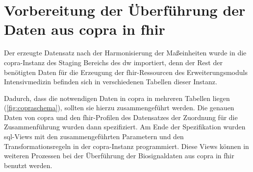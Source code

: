 \section[Vorbereitung der Überführung der Daten aus \acs{copra} in \acs{fhir}]{ Vorbereitung der Überführung der Daten aus \acs{copra} in \acs{fhir}} \label{sec:docutransfer}

Der erzeugte Datensatz nach der Harmonisierung der Maßeinheiten wurde in die \ac{copra}-Instanz des Staging Bereichs des \ac{dw} importiert, denn der Rest der benötigten Daten für die Erzeugung der \ac{fhir}-Ressourcen des Erweiterungsmoduls \glqq Intensivmedizin\grqq{} befinden sich in verschiedenen Tabellen dieser Instanz. 

Dadurch, dass die notwendigen Daten in \ac{copra} in mehreren Tabellen liegen (\ref{fig:copraschema}), sollten sie hierzu zusammengeführt werden. Die genauen Daten von \ac{copra} und den \ac{fhir}-Profilen des Datensatzes der Zuordnung für die Zusammenführung wurden dann spezifiziert.
Am Ende der Spezifikation wurden \ac{sql}-Views mit den zusammengeführten Parametern und den Transformationsregeln in der \ac{copra}-Instanz programmiert. Diese Views können in weiteren Prozessen bei der Überführung der Biosignaldaten aus \ac{copra} in \ac{fhir} benutzt werden.
